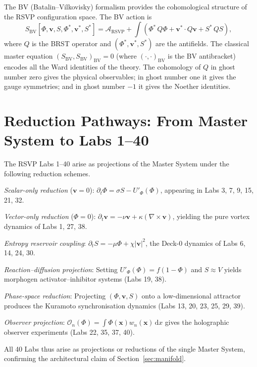 \documentclass[12pt, a4paper]{article}
\theoremstyle{plain}
\theoremstyle{definition}
\theoremstyle{remark}
\newcommand{\vfield}{\mathbf{v}}
\newcommand{\ARSVP}{\mathcal{A}_{\mathrm{RSVP}}}
\begin{document}
The BV (Batalin--Vilkovisky) formalism provides the cohomological structure of the
RSVP configuration space.  The BV action is
\[
S_{\mathrm{BV}}[\Phi, \vfield, S, \Phi^*, \vfield^*, S^*]
= \ARSVP + \int(\Phi^*\,Q\Phi + \vfield^*\cdot Q\vfield + S^*\,QS),
\]
where $Q$ is the BRST operator and $(\Phi^*, \vfield^*, S^*)$ are the antifields.  The
classical master equation $(S_{\mathrm{BV}}, S_{\mathrm{BV}})_{\mathrm{BV}} = 0$ (where
$(\cdot,\cdot)_{\mathrm{BV}}$ is the BV antibracket) encodes all the Ward identities of
the theory.  The cohomology of $Q$ in ghost number zero gives the physical observables;
in ghost number one it gives the gauge symmetries; and in ghost number $-1$ it gives
the Noether identities.

\section{Reduction Pathways: From Master System to Labs 1--40}
\label{app:reductions}

The RSVP Labs 1--40 arise as projections of the Master System under the following
reduction schemes.

\emph{Scalar-only reduction} ($\vfield = 0$): $\partial_t\Phi = \sigma S - U'_\Phi(\Phi)$,
appearing in Labs 3, 7, 9, 15, 21, 32.

\emph{Vector-only reduction} ($\Phi = 0$): $\partial_t\vfield = -\nu\vfield + \kappa(\nabla\times\vfield)$,
yielding the pure vortex dynamics of Labs 1, 27, 38.

\emph{Entropy reservoir coupling}: $\partial_t S = -\mu\Phi + \chi|\vfield|^2$,
the Deck-0 dynamics of Labs 6, 14, 24, 30.

\emph{Reaction--diffusion projection}: Setting $U'_\Phi(\Phi) = f(1-\Phi)$ and $S \approx V$
yields morphogen activator--inhibitor systems (Labs 19, 38).

\emph{Phase-space reduction}: Projecting $(\Phi,\vfield,S)$ onto a low-dimensional attractor
produces the Kuramoto synchronisation dynamics (Labs 13, 20, 23, 25, 29, 39).

\emph{Observer projection}: $\mathcal{O}_n(\Phi) = \int\Phi(\mathbf{x})w_n(\mathbf{x})\,\mathrm{d}x$
gives the holographic observer experiments (Labs 22, 35, 37, 40).

All 40 Labs thus arise as projections or reductions of the single Master System,
confirming the architectural claim of Section~\ref{sec:manifold}.

\end{document}
